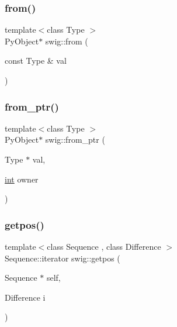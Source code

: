 \mbox{\label{namespaceswig_a62bf3d7d1ef1d4e3717f290cbe930bdb}} 
\subsubsection{\texorpdfstring{from()}{from()}}
{\footnotesize\ttfamily template$<$class Type $>$ \\
Py\+Object$\ast$ swig\+::from (\begin{DoxyParamCaption}\item[{const Type \&}]{val }\end{DoxyParamCaption})\hspace{0.3cm}{\ttfamily [inline]}}

\mbox{\label{namespaceswig_ae03eccbf86cf1d7ce91b7d50d01531b8}} 
\subsubsection{\texorpdfstring{from\+\_\+ptr()}{from\_ptr()}}
{\footnotesize\ttfamily template$<$class Type $>$ \\
Py\+Object$\ast$ swig\+::from\+\_\+ptr (\begin{DoxyParamCaption}\item[{Type $\ast$}]{val,  }\item[{\hyperlink{lp__lib_8h_adeb9ec6400320e4923ac9d836d509ddb}{int}}]{owner }\end{DoxyParamCaption})\hspace{0.3cm}{\ttfamily [inline]}}

\mbox{\label{namespaceswig_a9e303b7ffb07262184774567f345a51e}} 
\subsubsection{\texorpdfstring{getpos()}{getpos()}}
{\footnotesize\ttfamily template$<$class Sequence , class Difference $>$ \\
Sequence\+::iterator swig\+::getpos (\begin{DoxyParamCaption}\item[{Sequence $\ast$}]{self,  }\item[{Difference}]{i }\end{DoxyParamCaption})\hspace{0.3cm}{\ttfamily [inline]}}

